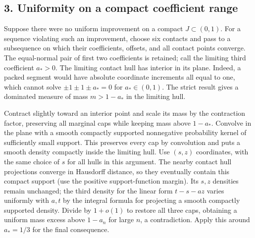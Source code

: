 \documentclass[
  10pt,
]{article}
\begin{document}
\subsection{3. Uniformity on a compact coefficient
range}\label{uniformity-on-a-compact-coefficient-range}

Suppose there were no uniform improvement on a compact
\(J\subset(0,1)\). For a sequence violating such an improvement, choose
six contacts and pass to a subsequence on which their coefficients,
offsets, and all contact points converge. The equal-normal pair of first
two coefficients is retained; call the limiting third coefficient
\(a_*>0\). The limiting contact hull has interior in its plane. Indeed,
a packed segment would have absolute coordinate increments all equal to
one, which cannot solve \(\pm1\pm1\pm a_*=0\) for \(a_*\in(0,1)\). The
strict result gives a dominated measure of mass \(m>1-a_*\) in the
limiting hull.

Contract slightly toward an interior point and scale its mass by the
contraction factor, preserving all marginal caps while keeping mass
above \(1-a_*\). Convolve in the plane with a smooth compactly supported
nonnegative probability kernel of sufficiently small support. This
preserves every cap by convolution and puts a smooth density compactly
inside the limiting hull. Use \((s,z)\) coordinates, with the same
choice of \(s\) for all hulls in this argument. The nearby contact hull
projections converge in Hausdorff distance, so they eventually contain
this compact support (use the positive support-function margin). Its
\(s,z\) densities remain unchanged; the third density for the linear
form \(t-s-az\) varies uniformly with \(a,t\) by the integral formula
for projecting a smooth compactly supported density. Divide by
\(1+o(1)\) to restore all three caps, obtaining a uniform mass excess
above \(1-a_n\) for large \(n\), a contradiction. Apply this around
\(a_*=1/3\) for the final consequence.
\end{document}
